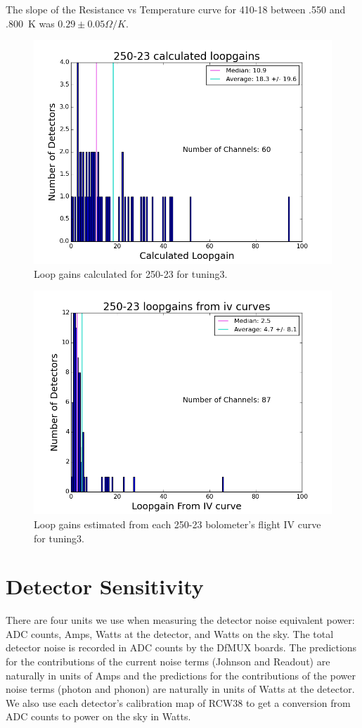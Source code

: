 The slope of the Resistance vs Temperature curve for 410-18 between .550 and .800~K was $0.29\pm0.05 \Omega/K$. 

\begin{figure}[htbp]
\begin{center}
\includegraphics[width=0.5 \textwidth]{figures/250-23_loopgains_calculated_tuning3.png}
\caption{Loop gains calculated for 250-23 for tuning3.}
\label{fig:loopgain_calc_hist}
\end{center}
\end{figure}

\begin{figure}[htbp]
\begin{center}
\includegraphics[width=0.5 \textwidth]{figures/250-23_loopgains_from_iv_tuning3.png}
\caption{Loop gains estimated from each 250-23 bolometer's flight IV curve for tuning3.}
\label{fig:loopgain_from_iv_hist}
\end{center}
\end{figure}


%
%
%
\section{Detector Sensitivity}
\label{sensitivity}
%
There are four units we use when measuring the detector noise equivalent power: ADC counts, Amps, Watts at the detector, and Watts on the sky. 
The total detector noise is recorded in ADC counts by the DfMUX boards. 
The predictions for the contributions of the current noise terms (Johnson and Readout) are naturally in units of Amps and the predictions for the contributions of the power noise terms (photon and phonon) are naturally in units of Watts at the detector. 
We also use each detector's calibration map of RCW38 to get a conversion from ADC counts to power on the sky in Watts.

